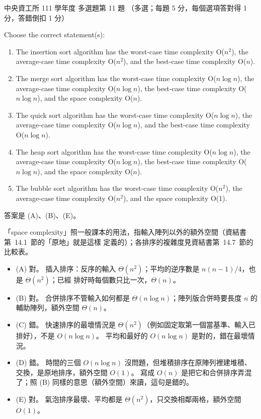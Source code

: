 \begin{pastexam}[label={px:ncu-111-dsa-11}]{中央資工所 111 學年度 多選題第 11 題}
（多選；每題 5 分，每個選項答對得 1 分，答錯倒扣 1 分）

Choose the correct statement(s):
\begin{enumerate}[label=(\Alph*)]
\item The insertion sort algorithm has the worst-case time complexity O($n^2$), the average-case
time complexity O($n^2$), and the best-case time complexity O($n$).
\item The merge sort algorithm has the worst-case time complexity O($n\log n$), the average-case
time complexity O($n\log n$), the best-case time complexity O($n\log n$), and the space complexity
O($n$).
\item The quick sort algorithm has the worst-case time complexity O($n\log n$), the average-case
time complexity O($n\log n$), and the best-case time complexity O($n\log n$).
\item The heap sort algorithm has the worst-case time complexity O($n\log n$), the average-case time
complexity O($n\log n$), the best-case time complexity O($n\log n$), and the space complexity O($n$).
\item The bubble sort algorithm has the worst-case time complexity O($n^2$), the average-case time
complexity O($n^2$), and the space complexity O(1).
\end{enumerate}
\end{pastexam}

\begin{pastsoln}
答案是 (A)、(B)、(E)。

「space complexity」照一般課本的用法，指輸入陣列以外的額外空間（資結書第~14.1~節的「原地」就是這樣
定義的）；各排序的複雜度見資結書第~14.7~節的比較表。
\begin{itemize}
\item (A) 對。 插入排序：反序的輸入 $\Theta(n^2)$；平均的逆序數是 $n(n-1)/4$，也是 $\Theta(n^2)$；已經
排好時每個數只比一次，$\Theta(n)$。
\item (B) 對。 合併排序不管輸入如何都是 $\Theta(n \log n)$；陣列版合併時要長度 $n$ 的輔助陣列，額外空間
$\Theta(n)$。
\item (C) 錯。 快速排序的最壞情況是 $\Theta(n^2)$（例如固定取第一個當基準、輸入已排好），不是
$O(n \log n)$。 平均和最好的 $O(n \log n)$ 是對的，錯在最壞情況。
\item (D) 錯。 時間的三個 $O(n \log n)$ 沒問題，但堆積排序在原陣列裡建堆積、交換，是原地排序，額外空間
$O(1)$。 寫成 $O(n)$ 是把它和合併排序弄混了；照 (B) 同樣的意思（額外空間）來讀，這句是錯的。
\item (E) 對。 氣泡排序最壞、平均都是 $\Theta(n^2)$，只交換相鄰兩格，額外空間 $O(1)$。
\end{itemize}
\end{pastsoln}
